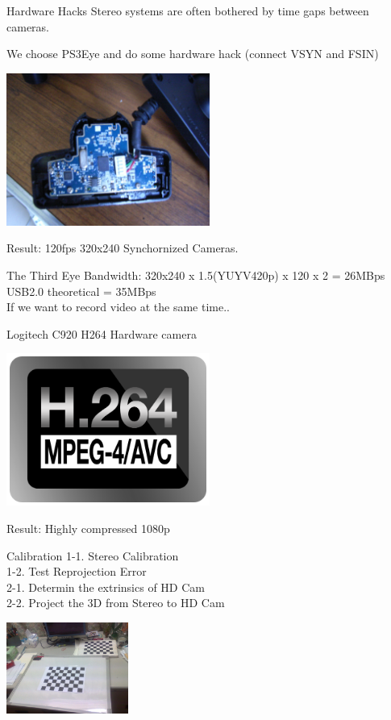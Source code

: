 \documentclass{beamer}
\begin{document}
	\begin{frame}{Hardware Hacks}
		Stereo systems are often bothered by time gaps between cameras.\\
		\uncover<2->
		{
			We choose PS3Eye and do some hardware hack (connect VSYN and FSIN)
			\begin{center}
				\includegraphics[width=0.5\textwidth]{./pics/mia_pcb.jpg} 
			\end{center}
			Result: 120fps 320x240 Synchornized Cameras.
		}
	\end{frame}

	\begin{frame}{The Third Eye}
		Bandwidth: 320x240 x 1.5(YUYV420p) x 120 x 2 = 26MBps\\
		USB2.0 theoretical = 35MBps\\
		If we want to record video at the same time..\\
		\uncover<2->
		{
			Logitech C920 H264 Hardware camera\\
			\begin{center}
				\includegraphics[width=0.5\textwidth]{./pics/h264-logo.png} 
			\end{center}
			Result: Highly compressed 1080p
		}
	\end{frame}

	\begin{frame}{Calibration}
		1-1. Stereo Calibration\\
		1-2. Test Reprojection Error\\
		2-1. Determin the extrinsics of HD Cam\\
		2-2. Project the 3D from Stereo to HD Cam
		\begin{center}
			\includegraphics[width=0.3\textwidth]{./pics/chessboard.jpg} 
		\end{center}
	\end{frame}
\end{document}
